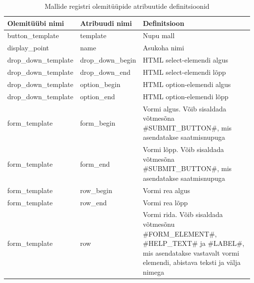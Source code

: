 \documentclass[a4paper,12pt]{article} %
\begin{document}
\begin{table}[H]
\centering
\caption{Mallide registri olemitüüpide atribuutide definitsioonid}
\label{table_er_mallide_registri_olemitüüpide_atribuutide_definitsioonid}
\begin{tabular}{|p{5cm}|p{5cm}|p{5cm}|}
\hline
\rowcolor{rowgray}
Olemitüübi nimi & Atribuudi nimi & Definitsioon \\ \hline
button\_template & template & Nupu mall \\ \hline
display\_point & name & Asukoha nimi \\ \hline
drop\_down\_template & drop\_down\_begin & HTML select-elemendi algus \\ \hline
drop\_down\_template & drop\_down\_end & HTML select-elemendi lõpp \\ \hline
drop\_down\_template & option\_begin & HTML option-elemendi algus \\ \hline
drop\_down\_template & option\_end & HTML option-elemendi lõpp \\ \hline
form\_template & form\_begin & Vormi algus. Võib sisaldada võtmesõna \#SUBMIT\_BUTTON\#, mis asendatakse saatmisnupuga \\ \hline
form\_template & form\_end & Vormi lõpp. Võib sisaldada võtmesõna \#SUBMIT\_BUTTON\#, mis asendatakse saatmisnupuga \\ \hline
form\_template & row\_begin & Vormi rea algus \\ \hline
form\_template & row\_end & Vormi rea lõpp \\ \hline
form\_template & row & Vormi rida. Võib sisaldada võtmesõnu \#FORM\_ELEMENT\#, \#HELP\_TEXT\# ja \#LABEL\#, mis asendatakse vastavalt vormi elemendi, abistava teksti ja välja nimega \\ \hline
\end{tabular}
\end{table}
\end{document}
